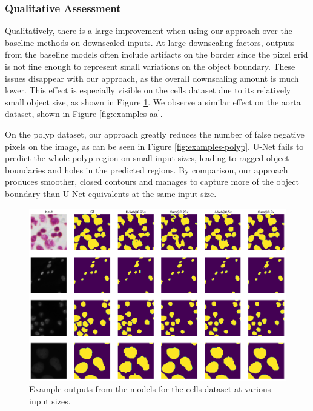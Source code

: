 \subsubsection{Qualitative Assessment}

Qualitatively, there is a large improvement when using our approach over the baseline methods on downscaled inputs. At large downscaling factors, outputs from the baseline models often include artifacts on the border since the pixel grid is not fine enough to represent small variations on the object boundary. These issues disappear with our approach, as the overall downscaling amount is much lower. This effect is especially visible on the cells dataset due to its relatively small object size, as shown in Figure \ref{fig:examples-cells}. We observe a similar effect on the aorta dataset, shown in Figure \ref{fig:examples-aa}.

On the polyp dataset, our approach greatly reduces the number of false negative pixels on the image, as can be seen in Figure \ref{fig:examples-polyp}. U-Net fails to predict the whole polyp region on small input sizes, leading to ragged object boundaries and holes in the predicted regions. By comparison, our approach produces smoother, closed contours and manages to capture more of the object boundary than U-Net equivalents at the same input size.

\begin{figure}[H]
	\includegraphics[width=\textwidth]{images/5/output_examples_cells.png}
	\caption{Example outputs from the models for the cells dataset at various input sizes. \cite{bencevicSegmentthenSegmentContextPreservingCropBased2023a}\label{fig:examples-cells}}
\end{figure}


